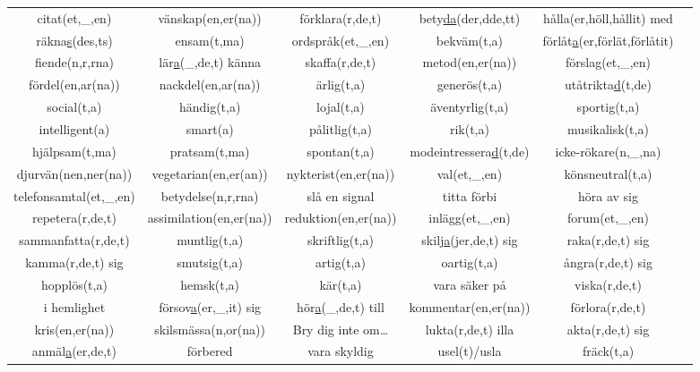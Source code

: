 \begin{center}
    \begin{adjustwidth}{-2.5cm}{}
        \begin{tabular}{|c c c c c c|}
            \hline
            citat(et,\_,en) & vänskap(en,er(na)) & förklara(r,de,t) & bety\underline{da}(der,dde,tt) & hålla(er,höll,hållit) med &  \\
            räkna\underline{s}(des,ts) & ensam(t,ma) & ordspråk(et,\_,en) & bekväm(t,a) & förlåt\underline{a}(er,förlät,förlåtit) &  \\
            fiende(n,r,rna) & lär\underline{a}(\_,de,t) känna & skaffa(r,de,t) & metod(en,er(na)) & förslag(et,\_,en) &  \\
            fördel(en,ar(na)) & nackdel(en,ar(na)) & ärlig(t,a) & generös(t,a) & utåtrikta\underline{d}(t,de) &  \\
            social(t,a) & händig(t,a) & lojal(t,a) & äventyrlig(t,a) & sportig(t,a) &  \\
            intelligent(a) & smart(a) & pålitlig(t,a) & rik(t,a) & musikalisk(t,a) &  \\
            hjälpsam(t,ma) & pratsam(t,ma) & spontan(t,a) & modeintressera\underline{d}(t,de) & icke-rökare(n,\_,na) &  \\
            djurvän(nen,ner(na)) & vegetarian(en,er(an)) & nykterist(en,er(na)) & val(et,\_,en) & könsneutral(t,a) &  \\
            telefonsamtal(et,\_,en) & betydelse(n,r,rna) & slå en signal & titta förbi & höra av sig &  \\
            repetera(r,de,t) & assimilation(en,er(na)) & reduktion(en,er(na)) & inlägg(et,\_,en) & forum(et,\_,en) &  \\
            sammanfatta(r,de,t) & muntlig(t,a) & skriftlig(t,a) & skil\underline{ja}(jer,de,t) sig & raka(r,de,t) sig &  \\
            kamma(r,de,t) sig & smutsig(t,a) & artig(t,a) & oartig(t,a) & ångra(r,de,t) sig &  \\
            hopplös(t,a) & hemsk(t,a) & kär(t,a) & vara säker på & viska(r,de,t) &  \\
            i hemlighet & försov\underline{a}(er,\_,it) sig & hör\underline{a}(\_,de,t) till & kommentar(en,er(na)) & förlora(r,de,t) &  \\
            kris(en,er(na)) & skilsmässa(n,or(na)) & Bry dig inte om\ldots & lukta(r,de,t) illa & akta(r,de,t) sig &  \\
            anmäl\underline{a}(er,de,t) & förbered & vara skyldig & usel(t)/usla & fräck(t,a) &  \\

\end{tabular}
\end{adjustwidth}
\end{center}
